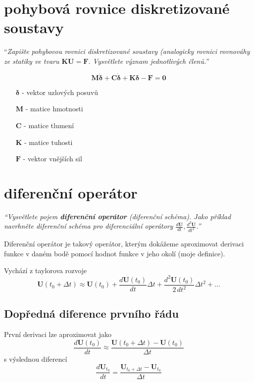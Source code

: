 \documentclass{article}
\begin{document}
	\section{pohybová rovnice diskretizované soustavy}
	``\emph{Zapište pohybovou rovnici diskretizované soustavy (analogicky rovnici rovnováhy ze statiky ve tvaru $\bm{K}\bm{U} = \bm{F}$. Vysvětlete význam jednotlivých členů.}''

	\begin{equation}
		\bm{M}\bm{\ddot{\delta}} + \bm{C}\bm{\dot{\delta}} + \bm{K}\bm{\delta} - \bm{F} = \bm{0}
	\end{equation}
	\begin{itemize}
		\item [$\bm{\delta}$] - vektor uzlových posuvů
		\item [$\bm{M}$] - matice hmotnosti
		\item [$\bm{C}$] - matice tlumení
		\item [$\bm{K}$] - matice tuhosti
		\item [$\bm{F}$] - vektor vnějších sil
	\end{itemize}

	\section{diferenční operátor}
	\emph{``Vysvětlete pojem \textbf{diferenční operátor} (diferenční schéma). Jako příklad navrhněte diferenční schéma pro diferenciální operátory $\frac{d\bm{U}}{dt},\frac{d^2\bm{U}}{dt^2}$.''}

	Diferenční operátor je takový operátor, kterým dokážeme aproximovat derivaci funkce v daném bodě pomocí hodnot funkce v jeho okolí (moje definice).
	
	Vychází z taylorova rozvoje
	\begin{equation}
		\bm{U}(t_0+\Delta t) \approx \bm{U}(t_0) + \frac{d\bm{U}(t_0)}{dt} \Delta t + \frac{d^2\bm{U}(t_0)}{2\,dt^2} \Delta t^2 + \dots
	\end{equation}
	
	\subsection{Dopředná diference prvního řádu}
	
	První derivaci lze aproximovat jako
	\begin{equation}
		\frac{d\bm{U}(t_0)}{dt} \approx \frac{\bm{U}(t_0+\Delta t) - \bm{U}(t_0)}{\Delta t}
	\end{equation}
	s výslednou diferencí
	\begin{equation}
		\frac{d\bm{U}_{t_0}}{dt} = \frac{\bm{U}_{t_0+\Delta t} - \bm{U}_{t_0}}{\Delta t}
	\end{equation}
	
\end{document}
